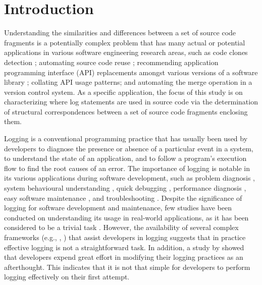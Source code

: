 \chapter{Introduction}  \label{Introduction}

Understanding the similarities and differences between a set of source code fragments is a potentially complex problem that has many actual or potential applications in various software engineering research areas, such as code clones detection \cite{2009:iwsc:bulychev}; automating source code reuse \cite{2008:fse:cottrell}; recommending application programming interface (API) replacements amongst various versions of a software library \cite{2014:uofc:cossette}; collating API usage patterns; and automating the merge operation in a version control system. As a specific application, the focus of this study is on characterizing where log statements are used in source code via the determination of structural correspondences between a set of source code fragments enclosing them.

Logging is a conventional programming practice that has usually been used by developers to diagnose the presence or absence of a particular event in a system, to understand the state of an application, and to follow a program's execution flow to find the root causes of an error. The importance of logging is notable in its various applications during software development, such as problem diagnosis \cite{lou2010mining}, system behavioural understanding \cite{fu2013contextual}, quick debugging \cite{gupta2005pro}, performance diagnosis \cite{nagaraj2012structured}, easy software maintenance \cite{gupta2005pro}, and troubleshooting \cite{fu2009execution}. Despite the significance of logging for software development and maintenance, few studies have been conducted on understanding its usage in real-world applications, as it has been considered to be a trivial task \cite{clarke1999dimension,clarke1999subject}. However, the availability of several complex frameworks (e.g., , ) that assist developers in logging suggests that in practice effective logging is not a straightforward task. In addition, a study by \citet{yuan2012characterizing} showed that developers expend great effort in modifying their logging practices as an afterthought. This indicates that it is not that simple for developers to perform logging effectively on their first attempt.

